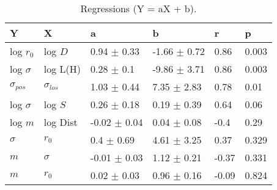 \begin{table}
\centering
\caption{Regressions (Y = aX + b).}
\begin{tabular}{llllll}
\toprule
              Y &               X &                 a &                 b &      r &      p \\
\midrule
      log $r_0$ &         log $D$ &   0.94 $\pm$ 0.33 &  -1.66 $\pm$ 0.72 &   0.86 &  0.003 \\
   log $\sigma$ &        log L(H) &    0.28 $\pm$ 0.1 &  -9.86 $\pm$ 3.71 &   0.86 &  0.003 \\
 $\sigma_{pos}$ &  $\sigma_{los}$ &   1.03 $\pm$ 0.44 &   7.35 $\pm$ 2.83 &   0.78 &   0.01 \\
   log $\sigma$ &         log $S$ &   0.26 $\pm$ 0.18 &   0.19 $\pm$ 0.39 &   0.64 &   0.06 \\
        log $m$ &        log Dist &  -0.02 $\pm$ 0.04 &   0.04 $\pm$ 0.08 &   -0.4 &   0.29 \\
       $\sigma$ &         $r_{0}$ &    0.4 $\pm$ 0.69 &   4.61 $\pm$ 3.25 &   0.37 &  0.329 \\
            $m$ &        $\sigma$ &  -0.01 $\pm$ 0.03 &   1.12 $\pm$ 0.21 &  -0.37 &  0.331 \\
            $m$ &         $r_{0}$ &   0.02 $\pm$ 0.03 &   0.96 $\pm$ 0.16 &  -0.09 &  0.824 \\
\bottomrule
\end{tabular}
\end{table}
